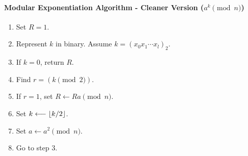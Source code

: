\paragraph{Modular Exponentiation Algorithm - Cleaner Version ($a^k\pmod n$)}
	\begin{enumerate}[1.]
		\item Set $R=1$.
		\item Represent $k$ in binary. Assume $k=(x_0x_1\cdots x_l)_2$.
		\item If $k=0$, return $R$.
		\item Find $r = (k\pmod2)$.
		\item If $r=1$, set $R\longleftarrow Ra\pmod n$.
		\item Set $k\longleftarrow \left\lfloor{k/2}\right\rfloor$.
		\item Set $a\longleftarrow a^2\pmod n$.
		\item Go to step $3$.
	\end{enumerate}

